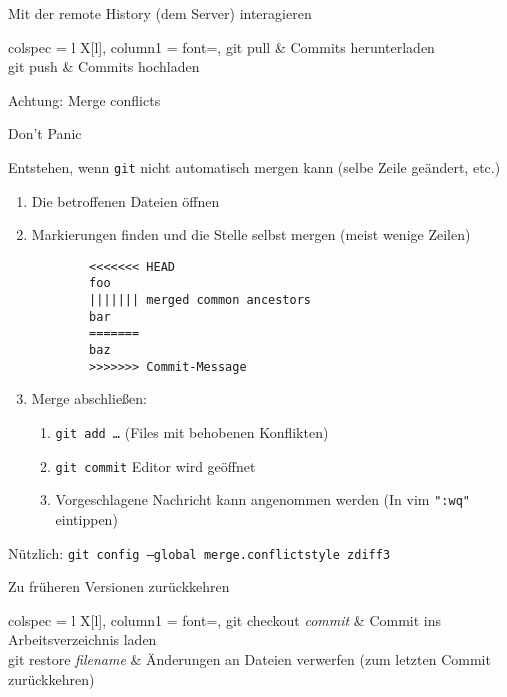 \begin{frame}{Mit der remote History (dem Server) interagieren}
  \begin{tblr}{
      colspec = {l X[l]},
      column{1} = {font=\ttfamily},
    }
    git pull          & Commits herunterladen \\
    git push          & Commits hochladen
  \end{tblr}
\end{frame}

\begin{frame}[fragile]{Achtung: Merge conflicts}
  \begin{center}
    \huge Don't Panic
  \end{center}

  Entstehen, wenn \texttt{git} nicht automatisch mergen kann (selbe Zeile geändert, etc.)

  \begin{enumerate}
    \item Die betroffenen Dateien öffnen
    \item Markierungen finden und die Stelle selbst mergen (meist wenige Zeilen)
      \begin{verbatim}
        <<<<<<< HEAD
        foo
        ||||||| merged common ancestors
        bar
        =======
        baz
        >>>>>>> Commit-Message
\end{verbatim}
    \item Merge abschließen:
      \begin{enumerate}
          \item \texttt{git add …} \quad (Files mit behobenen Konflikten)
        \item \texttt{git commit} \quad\rightarrow\; Editor wird geöffnet
        \item Vorgeschlagene Nachricht kann angenommen werden (In vim \texttt{":wq"} eintippen)
      \end{enumerate}
  \end{enumerate}
  Nützlich: \texttt{git config --global merge.conflictstyle zdiff3}
\end{frame}

\begin{frame}{Zu früheren Versionen zurückkehren}
  \begin{tblr}{
      colspec = {l X[l]},
      column{1} = {font=\ttfamily},
    }
    git checkout \textit{commit} & Commit ins Arbeitsverzeichnis laden \\
    git restore \textit{filename} & Änderungen an Dateien verwerfen (zum letzten Commit zurückkehren)
  \end{tblr}
\end{frame}

